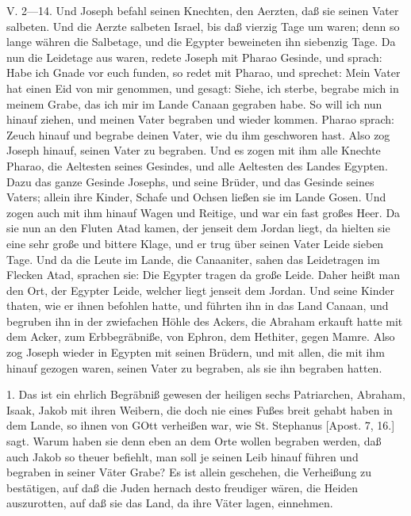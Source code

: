 \begin{schriftzitat}
V. 2—14. Und Joseph befahl seinen Knechten, den Aerzten, daß sie seinen Vater salbeten. Und die Aerzte salbeten Israel, bis daß vierzig Tage um waren; denn so lange währen die Salbetage, und die Egypter beweineten ihn siebenzig Tage. Da nun die Leidetage aus waren, redete Joseph mit Pharao Gesinde, und sprach: Habe ich Gnade vor euch funden, so redet mit Pharao, und sprechet: Mein Vater hat einen Eid von mir genommen, und gesagt: Siehe, ich sterbe, begrabe mich in meinem Grabe, das ich mir im Lande Canaan gegraben habe. So will ich nun hinauf ziehen, und meinen Vater begraben und wieder kommen. Pharao sprach: Zeuch hinauf und begrabe deinen Vater, wie du ihm geschworen hast. Also zog Joseph hinauf, seinen Vater zu begraben. Und es zogen mit ihm alle Knechte Pharao, die Aeltesten seines Gesindes, und alle Aeltesten des Landes Egypten. Dazu das ganze Gesinde Josephs, und seine Brüder, und das Gesinde seines Vaters; allein ihre Kinder, Schafe und Ochsen ließen sie im Lande Gosen. Und zogen auch mit ihm hinauf Wagen und Reitige, und war ein fast großes Heer. Da sie nun an den Fluten Atad kamen, der jenseit dem Jordan liegt, da hielten sie eine sehr große und bittere Klage, und er trug über seinen Vater Leide sieben Tage. Und da die Leute im Lande, die Canaaniter, sahen das Leidetragen im Flecken Atad, sprachen sie: Die Egypter tragen da große Leide. Daher heißt man den Ort, der Egypter Leide, welcher liegt jenseit dem Jordan. Und seine Kinder thaten, wie er ihnen befohlen hatte, und führten ihn in das Land Canaan, und begruben ihn in der zwiefachen Höhle des Ackers, die Abraham erkauft hatte mit dem Acker, zum Erbbegräbniße, von Ephron, dem Hethiter, gegen Mamre. Also zog Joseph wieder in Egypten mit seinen Brüdern, und mit allen, die mit ihm hinauf gezogen waren, seinen Vater zu begraben, als sie ihn begraben hatten.
\end{schriftzitat}

1. Das ist ein ehrlich Begräbniß gewesen der heiligen sechs Patriarchen, Abraham, Isaak, Jakob mit ihren Weibern, die doch nie eines Fußes breit gehabt haben in dem Lande, so ihnen von GOtt verheißen war, wie St. Stephanus [Apost. 7, 16.] sagt. Warum haben sie denn eben an dem Orte wollen begraben werden, daß auch Jakob so theuer befiehlt, man soll je seinen Leib hinauf führen und begraben in seiner Väter Grabe? Es ist allein geschehen, die Verheißung zu bestätigen, auf daß die Juden hernach desto freudiger wären, die Heiden auszurotten, auf daß sie das Land, da ihre Väter lagen, einnehmen.

